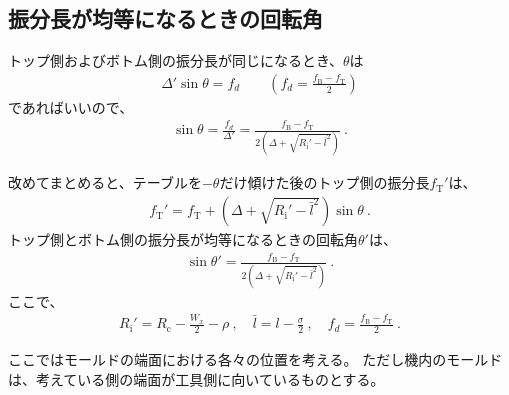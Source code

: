 \subsection{振分長が均等になるときの回転角}
トップ側およびボトム側の振分長が同じになるとき、$\theta$は
\begin{align*}
  \varDelta'\sin\theta = f_d \qquad \left(f_d = \frac{f_\mathrm B-f_\mathrm T}2\right)
\end{align*}
であればいいので、
\begin{align*}
  \sin\theta = \frac{f_d}{\varDelta'}
  = \frac{f_\mathrm B-f_\mathrm T}{2\left(\varDelta+\sqrt{R_\mathrm i'-\bar l^2}\right)}~.
\end{align*}
\begin{hosoku}
改めてまとめると、テーブルを$-\theta$だけ傾けた後のトップ側の振分長$f_\mathrm T'$は、
\begin{align*}
  f_\mathrm T' = f_\mathrm T+\left(\varDelta+\sqrt{R_\mathrm i'-\bar l^2}\right)\!\sin\theta\ .
\end{align*}
トップ側とボトム側の振分長が均等になるときの回転角$\theta'$は、
\begin{align*}
  \sin\theta' = \frac{f_\mathrm B-f_\mathrm T}{2\left(\varDelta+\sqrt{R_\mathrm i'-\bar l^2}\right)}\ .
\end{align*}
ここで、
\begin{align*}
  R_\mathrm i' = R_\mathrm c-\frac{W_x}2-\rho\ ,\quad
  \bar l = l-\frac\sigma2\ ,\quad
  f_d = \frac{f_\mathrm B-f_\mathrm T}2\ .
\end{align*}
\end{hosoku}




ここではモールドの端面における各々の位置を考える。
ただし機内のモールドは、考えている側の端面が工具側に向いているものとする。




